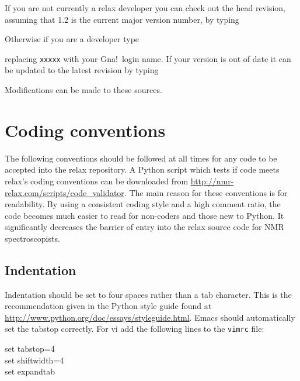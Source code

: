If you are not currently a relax developer you can check out the head revision, assuming that 1.2 is the current major version number, by typing


Otherwise if you are a developer type


replacing \texttt{xxxxx} with your Gna!\ login name.  If your version is out of date it can be updated to the latest revision by typing


Modifications can be made to these sources.




\section{Coding conventions}

The following conventions should be followed at all times for any code to be accepted into the relax repository.  A Python script which tests if code meets relax's coding conventions can be downloaded from \href{http://nmr-relax.com/scripts/code\_validator}{http://nmr-relax.com/scripts/code\_validator}.  The main reason for these conventions is for readability.  By using a consistent coding style and a high comment ratio, the code becomes much easier to read for non-coders and those new to Python.  It significantly decreases the barrier of entry into the relax source code for NMR spectroscopists.



\subsection{Indentation}

Indentation should be set to four spaces rather than a tab character.  This is the recommendation given in the Python style guide found at \href{http://www.python.org/doc/essays/styleguide.html}{http://www.python.org/doc/essays/styleguide.html}.  Emacs should automatically set the tabstop correctly.  For vi add the following lines to the \texttt{vimrc} file:

\begin{exampleenv}
set tabstop=4 \\
set shiftwidth=4 \\
set expandtab
\end{exampleenv}

